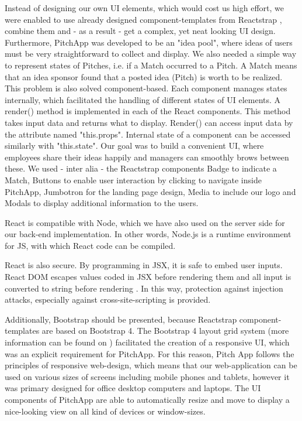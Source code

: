 Instead of designing our own UI elements, which would cost us high effort, we were enabled to use already designed component-templates from Reactstrap \parencite{Reactstrap_comp}, combine them and - as a result - get a complex, yet neat looking UI design. Furthermore, PitchApp was developed to be an "idea pool", where ideas of users must be very straightforward to collect and display. We also needed a simple way to represent states of Pitches, i.e. if a Match occurred to a Pitch. A Match means that an idea sponsor found that a posted idea (Pitch) is worth to be realized. This problem is also solved component-based. Each component manages states internally, which facilitated the handling of different states of UI elements. A render() method is implemented in each of the React components. This method takes input data and returns what to display. Render() can access input data by the attribute named "this.props". Internal state of a component can be accessed similarly with "this.state". Our goal was to build a convenient UI, where employees share their ideas happily and managers can smoothly brows between these. We used - inter alia - the Reactstrap components Badge to indicate a Match, Buttons to enable user interaction by clicking to navigate inside PitchApp, Jumbotron for the landing page design, Media to include our logo and Modals to display additional information to the users.

React is compatible with Node, which we have also used on the server side for our back-end implementation. In other words, Node.js is a runtime environment for JS, with which React code can be compiled.

React is also secure. By programming in JSX, it is safe to embed user inputs. React DOM escapes values coded in JSX before rendering them and all input is converted to string before rendering \parencite{JSX}. In this way, protection against injection attacks, especially against cross-site-scripting is provided.

Additionally, Bootstrap \parencite{Bootstrap} should be presented, because Reactstrap component-templates are based on Bootstrap 4. The Bootstrap 4 layout grid system (more information can be found on \parencite{Bootstrap_grid}) facilitated the creation of a responsive UI, which was an explicit requirement for PitchApp. For this reason, Pitch App follows the principles of responsive web-design, which means that our web-application can be used on various sizes of screens including mobile phones and tablets, however it was primary designed for office desktop computers and laptops. The UI components of PitchApp are able to automatically resize and move to display a nice-looking view on all kind of devices or window-sizes. 

